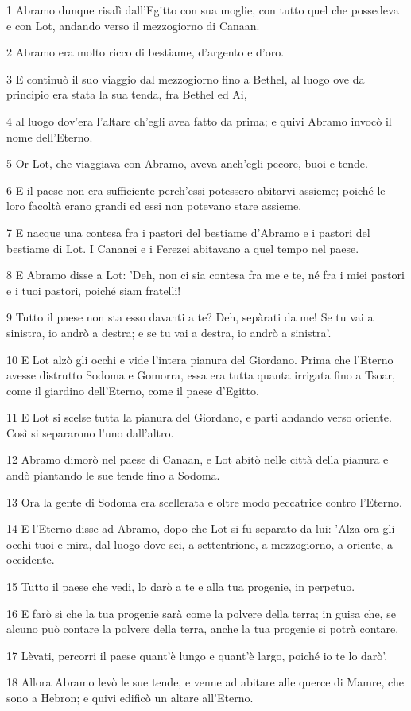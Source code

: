 \par 1 Abramo dunque risalì dall'Egitto con sua moglie, con tutto quel che possedeva e con Lot, andando verso il mezzogiorno di Canaan.
\par 2 Abramo era molto ricco di bestiame, d'argento e d'oro.
\par 3 E continuò il suo viaggio dal mezzogiorno fino a Bethel, al luogo ove da principio era stata la sua tenda, fra Bethel ed Ai,
\par 4 al luogo dov'era l'altare ch'egli avea fatto da prima; e quivi Abramo invocò il nome dell'Eterno.
\par 5 Or Lot, che viaggiava con Abramo, aveva anch'egli pecore, buoi e tende.
\par 6 E il paese non era sufficiente perch'essi potessero abitarvi assieme; poiché le loro facoltà erano grandi ed essi non potevano stare assieme.
\par 7 E nacque una contesa fra i pastori del bestiame d'Abramo e i pastori del bestiame di Lot. I Cananei e i Ferezei abitavano a quel tempo nel paese.
\par 8 E Abramo disse a Lot: 'Deh, non ci sia contesa fra me e te, né fra i miei pastori e i tuoi pastori, poiché siam fratelli!
\par 9 Tutto il paese non sta esso davanti a te? Deh, sepàrati da me! Se tu vai a sinistra, io andrò a destra; e se tu vai a destra, io andrò a sinistra'.
\par 10 E Lot alzò gli occhi e vide l'intera pianura del Giordano. Prima che l'Eterno avesse distrutto Sodoma e Gomorra, essa era tutta quanta irrigata fino a Tsoar, come il giardino dell'Eterno, come il paese d'Egitto.
\par 11 E Lot si scelse tutta la pianura del Giordano, e partì andando verso oriente. Così si separarono l'uno dall'altro.
\par 12 Abramo dimorò nel paese di Canaan, e Lot abitò nelle città della pianura e andò piantando le sue tende fino a Sodoma.
\par 13 Ora la gente di Sodoma era scellerata e oltre modo peccatrice contro l'Eterno.
\par 14 E l'Eterno disse ad Abramo, dopo che Lot si fu separato da lui: 'Alza ora gli occhi tuoi e mira, dal luogo dove sei, a settentrione, a mezzogiorno, a oriente, a occidente.
\par 15 Tutto il paese che vedi, lo darò a te e alla tua progenie, in perpetuo.
\par 16 E farò sì che la tua progenie sarà come la polvere della terra; in guisa che, se alcuno può contare la polvere della terra, anche la tua progenie si potrà contare.
\par 17 Lèvati, percorri il paese quant'è lungo e quant'è largo, poiché io te lo darò'.
\par 18 Allora Abramo levò le sue tende, e venne ad abitare alle querce di Mamre, che sono a Hebron; e quivi edificò un altare all'Eterno.


